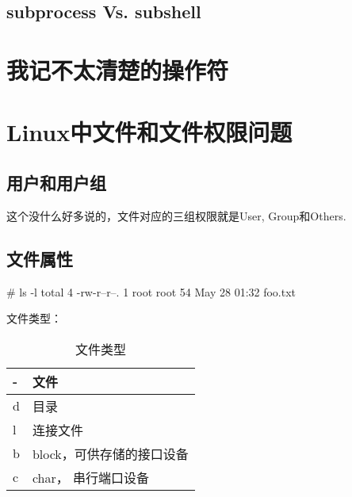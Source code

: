 \subsection{subprocess Vs. subshell}


\section{我记不太清楚的操作符}

\section{Linux中文件和文件权限问题}

\subsection{用户和用户组}

这个没什么好多说的，文件对应的三组权限就是User, Group和Others.

\subsection{文件属性}

\begin{Bash}
# ls -l
total 4
-rw-r--r--. 1 root root 54 May 28 01:32 foo.txt
\end{Bash}

文件类型：

\begin{table}
\caption{文件类型}    %

\begin{tabular}{|l|l|} 


\hline %
- & 文件\\
\hline
d & 目录\\
\hline
l & 连接文件\\
\hline
b & block，可供存储的接口设备\\
\hline
c & char， 串行端口设备\\
\hline

\end{tabular}


\end{table}

